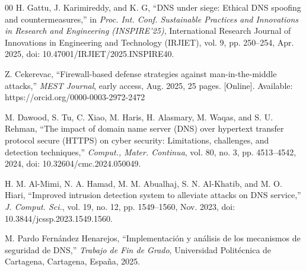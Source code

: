 \documentclass[conference]{IEEEtran}
\begin{document}
\begin{thebibliography}{00}
H. Gattu, J. Karimireddy, and K. G, ``DNS under siege: Ethical DNS spoofing and countermeasures,'' in \textit{Proc. Int. Conf. Sustainable Practices and Innovations in Research and Engineering (INSPIRE'25)}, International Research Journal of Innovations in Engineering and Technology (IRJIET), vol. 9, pp. 250--254, Apr. 2025, doi: 10.47001/IRJIET/2025.INSPIRE40.

Z. Cekerevac, ``Firewall-based defense strategies against man-in-the-middle attacks,'' \textit{MEST Journal}, early access, Aug. 2025, 25 pages. [Online]. Available: https://orcid.org/0000-0003-2972-2472

M. Dawood, S. Tu, C. Xiao, M. Haris, H. Alasmary, M. Waqas, and S. U. Rehman, ``The impact of domain name server (DNS) over hypertext transfer protocol secure (HTTPS) on cyber security: Limitations, challenges, and detection techniques,'' \textit{Comput., Mater. Continua}, vol. 80, no. 3, pp. 4513--4542, 2024, doi: 10.32604/cmc.2024.050049.

H. M. Al-Mimi, N. A. Hamad, M. M. Abualhaj, S. N. Al-Khatib, and M. O. Hiari, ``Improved intrusion detection system to alleviate attacks on DNS service,'' \textit{J. Comput. Sci.}, vol. 19, no. 12, pp. 1549--1560, Nov. 2023, doi: 10.3844/jcssp.2023.1549.1560.

M. Pardo Fernández Henarejos, ``Implementación y análisis de los mecanismos de seguridad de DNS,'' \textit{Trabajo de Fin de Grado}, Universidad Politécnica de Cartagena, Cartagena, España, 2025.


\end{thebibliography}
\end{document}
